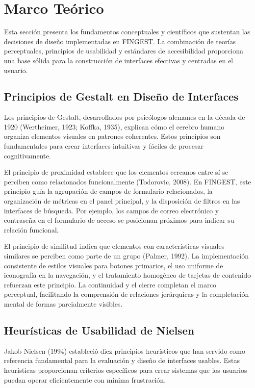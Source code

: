 \documentclass[12pt,a4paper,oneside]{article}
\begin{document}
\section{Marco Teórico}

Esta sección presenta los fundamentos conceptuales y científicos que sustentan las decisiones de diseño implementadas en FINGEST. La combinación de teorías perceptuales, principios de usabilidad y estándares de accesibilidad proporciona una base sólida para la construcción de interfaces efectivas y centradas en el usuario.

\subsection{Principios de Gestalt en Diseño de Interfaces}

Los principios de Gestalt, desarrollados por psicólogos alemanes en la década de 1920 (Wertheimer, 1923; Koffka, 1935), explican cómo el cerebro humano organiza elementos visuales en patrones coherentes. Estos principios son fundamentales para crear interfaces intuitivas y fáciles de procesar cognitivamente.

El principio de proximidad establece que los elementos cercanos entre sí se perciben como relacionados funcionalmente (Todorovic, 2008). En FINGEST, este principio guía la agrupación de campos de formulario relacionados, la organización de métricas en el panel principal, y la disposición de filtros en las interfaces de búsqueda. Por ejemplo, los campos de correo electrónico y contraseña en el formulario de acceso se posicionan próximos para indicar su relación funcional.

El principio de similitud indica que elementos con características visuales similares se perciben como parte de un grupo (Palmer, 1992). La implementación consistente de estilos visuales para botones primarios, el uso uniforme de iconografía en la navegación, y el tratamiento homogéneo de tarjetas de contenido refuerzan este principio. La continuidad y el cierre completan el marco perceptual, facilitando la comprensión de relaciones jerárquicas y la completación mental de formas parcialmente visibles.

\subsection{Heurísticas de Usabilidad de Nielsen}

Jakob Nielsen (1994) estableció diez principios heurísticos que han servido como referencia fundamental para la evaluación y diseño de interfaces usables. Estas heurísticas proporcionan criterios específicos para crear sistemas que los usuarios puedan operar eficientemente con mínima frustración.
\end{document}
